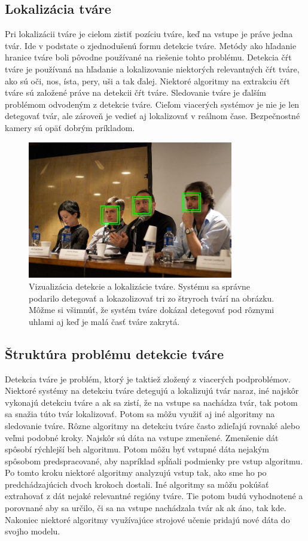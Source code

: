 \subsection{Lokalizácia tváre}
Pri lokalizácii tváre je cielom zistiť pozíciu tváre, keď na vstupe je práve jedna tvár. 
Ide v podstate o zjednodušenú formu detekcie tváre.
Metódy ako hľadanie hranice tváre boli pôvodne používané na riešenie tohto problému.
Detekcia čŕt tváre je používaná na hľadanie a lokalizovanie niektorých relevantných čŕt tváre, ako sú oči, nos, ísta, pery, uši a tak ďalej.
Niektoré algoritmy na extrakciu čŕt tváre sú založené práve na detekcii čŕt tváre.
Sledovanie tváre je ďalším problémom odvodeným z detekcie tváre. 
Cieľom viacerých systémov je nie je len detegovať tvár, ale zároveň je vedieť aj lokalizovať v reálnom čase. 
Bezpečnostné kamery sú opäť dobrým príkladom.

\begin{figure}[H]
\centerline{\includegraphics[width=0.8\textwidth]{images/detection_v}}
\caption[Detekcia tvára]{Vizualizácia detekcie a lokalizácie tváre. Systému sa správne podarilo detegovať a lokazolizovať
tri zo štryroch tvárí na obrázku. Môžme si všimnúť, že systém tváre dokázal detegovať pod rôznymi uhlami aj keď je malá časť tváre zakrytá.}
\label{obr:3step}
\end{figure}

\subsection{Štruktúra problému detekcie tváre}
Detekcia tváre je problém, ktorý je taktiež zložený z viacerých podproblémov.
Niektoré systémy na detekciu tváre  detegujú a lokalizujú tvár naraz, 
iné najskôr vykonajú detekciu tváre a ak sa zistí, že na vstupe sa nachádza tvár, tak potom sa snažia túto tvár lokalizovať.
Potom sa môžu využiť aj iné algoritmy na sledovanie tváre. 
Rôzne algoritmy na detekciu tváre často zdieľajú rovnaké alebo veľmi podobné kroky.
Najskôr sú dáta na vstupe zmenšené. Zmenšenie dát spôsobí rýchlejší beh algoritmu.
Potom môžu byť vstupné dáta nejakým spôsobom predspracované, aby napríklad spĺňali podmienky pre vstup algoritmu.
Po tomto kroku niektoré algoritmy analyzujú vstup tak, ako sme ho po predchádzajúcich dvoch krokoch dostali.
Iné algoritmy sa môžu pokúšať extrahovať z dát nejaké relevantné regióny tváre. 
Tie potom budú vyhodnotené a porovnané aby sa určilo, či sa na vstupe nachádzala tvár ak ak áno, tak kde.
Nakoniec niektoré algoritmy využívajúce strojové učenie pridajú nové dáta do svojho modelu.

